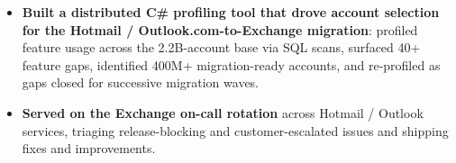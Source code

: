 \documentclass{resume-v2}
\begin{document}
\begin{itemize}
  \item \textbf{Built a distributed C\# profiling tool that drove account selection for the Hotmail / Outlook.com-to-Exchange migration}: profiled feature usage across the 2.2B-account base via SQL scans, surfaced 40+ feature gaps, identified 400M+ migration-ready accounts, and re-profiled as gaps closed for successive migration waves.
  \item \textbf{Served on the Exchange on-call rotation} across Hotmail / Outlook services, triaging release-blocking and customer-escalated issues and shipping fixes and improvements.
\end{itemize}
\end{document}
